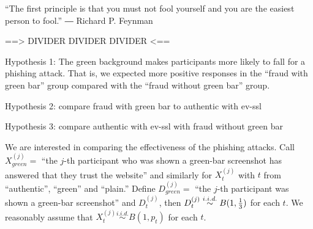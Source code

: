 “The first principle is that you must not fool yourself and you are the easiest person to fool.”
― Richard P. Feynman







==> DIVIDER DIVIDER DIVIDER <==

Hypothesis 1: The green background makes participants more likely to fall for a phishing attack. That is, we expected more positive responses in the ``fraud with green bar'' group compared with the ``fraud without green bar'' group.

Hypothesis 2: compare fraud with green bar to authentic with ev-ssl

Hypothesis 3: compare authentic with ev-ssl with fraud without green bar



We are interested in comparing the effectiveness of the phishing attacks. Call $X_{green}^{(j)} = $ ``the $j$-th participant who was shown a green-bar screenshot has answered that they trust the website'' and similarly for $X_{t}^{(j)}$ with $t$ from ``authentic'', ``green'' and ``plain.'' Define $D_{green}^{(j)} = $ ``the $j$-th participant was shown a green-bar screenshot'' and $D_{t}^{(j)}$, then $D_{t}^{(j)}\stackrel{i.i.d.}{\sim}B(1,{1\over 3})$ for each $t$. We reasonably assume that $X_{t}^{(j)}\stackrel{i.i.d.}{\sim}B(1,p_{t})$ for each $t$.

